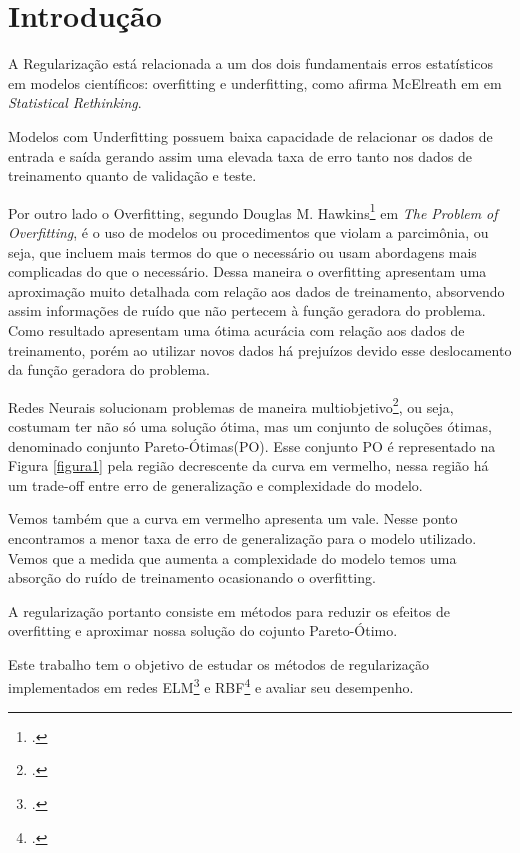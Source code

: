\section{Introdução}
A Regularização está relacionada a um dos dois fundamentais erros estatísticos em modelos científicos: overfitting e underfitting, como afirma McElreath em em \emph{Statistical Rethinking}\cite{mcelreath2016statistical}.

Modelos com Underfitting possuem baixa capacidade de relacionar os dados de entrada e saída gerando assim uma elevada taxa de erro tanto nos dados de treinamento quanto de validação e teste.

Por outro lado o Overfitting, segundo Douglas M. Hawkins\footcite{Corresponding author e-mail: doug@stat.umn.edu.} em \emph{The Problem of Overfitting}\cite{OverfittigProblems}, é o uso de modelos ou procedimentos que violam a parcimônia, ou seja, que incluem mais termos do que o necessário ou usam abordagens mais complicadas do que o necessário.\cite*{OverfittigProblems}
Dessa maneira o overfitting apresentam uma aproximação muito detalhada com relação aos dados de treinamento, absorvendo assim informações de ruído que não pertecem à função geradora do problema.
Como resultado apresentam uma ótima acurácia com relação aos dados de treinamento, porém ao utilizar novos dados há prejuízos devido esse deslocamento da função geradora do problema.

Redes Neurais solucionam problemas de maneira multiobjetivo\footcite{Problemas multiobjetivo: Problemas com mais de um objetivo.}, ou seja, costumam ter não só uma solução ótima, mas um conjunto de soluções ótimas, denominado conjunto Pareto-Ótimas(PO).
Esse conjunto PO é representado na Figura \ref*{figura1} pela região decrescente da curva em vermelho, nessa região há um trade-off entre erro de generalização e complexidade do modelo.

Vemos também que a curva em vermelho apresenta um vale. Nesse ponto encontramos a menor taxa de erro de generalização para o modelo utilizado.
Vemos que a medida que aumenta a complexidade do modelo temos uma absorção do ruído de treinamento ocasionando o overfitting.

A regularização portanto consiste em métodos para reduzir os efeitos de overfitting e aproximar nossa solução do cojunto Pareto-Ótimo.

Este trabalho tem o objetivo de estudar os métodos de regularização implementados em redes ELM\footcite{ELM: Extreme Learning Machines} e RBF\footcite{RBF: Radial Basis Function} e avaliar seu desempenho.

